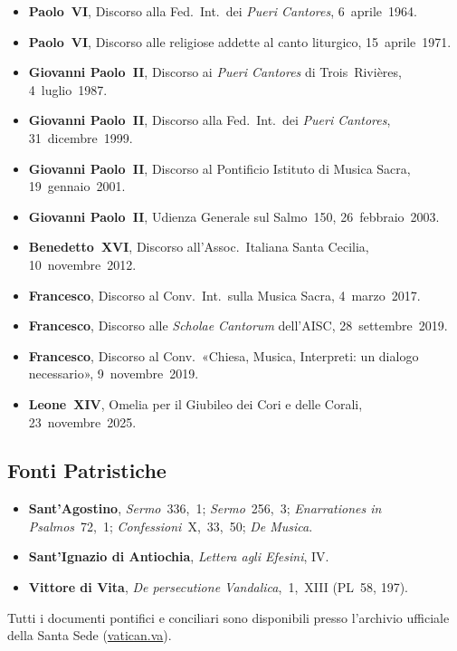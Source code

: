 \documentclass[12pt,a4paper]{article}
\begin{document}
	\begin{itemize}[leftmargin=*]
		\item \textbf{Paolo~VI}, Discorso alla Fed.\ Int.\ dei \emph{Pueri Cantores},
		6~aprile~1964.
		\item \textbf{Paolo~VI}, Discorso alle religiose addette al canto liturgico,
		15~aprile~1971.
		\item \textbf{Giovanni Paolo~II}, Discorso ai \emph{Pueri Cantores} di
		Trois~Rivières, 4~luglio~1987.
		\item \textbf{Giovanni Paolo~II}, Discorso alla Fed.\ Int.\ dei \emph{Pueri
			Cantores}, 31~dicembre~1999.
		\item \textbf{Giovanni Paolo~II}, Discorso al Pontificio Istituto di Musica
		Sacra, 19~gennaio~2001.
		\item \textbf{Giovanni Paolo~II}, Udienza Generale sul Salmo~150, 26~febbraio~2003.
		\item \textbf{Benedetto~XVI}, Discorso all'Assoc.\ Italiana Santa Cecilia,
		10~novembre~2012.
		\item \textbf{Francesco}, Discorso al Conv.\ Int.\ sulla Musica Sacra,
		4~marzo~2017.
		\item \textbf{Francesco}, Discorso alle \emph{Scholae Cantorum} dell'AISC,
		28~settembre~2019.
		\item \textbf{Francesco}, Discorso al Conv.\ «Chiesa, Musica, Interpreti: un
		dialogo necessario», 9~novembre~2019.
		\item \textbf{Leone~XIV}, Omelia per il Giubileo dei Cori e delle Corali,
		23~novembre~2025.
	\end{itemize}
	
	\subsection*{Fonti Patristiche}
	
	\begin{itemize}[leftmargin=*]
		\item \textbf{Sant'Agostino}, \emph{Sermo}~336,~1; \emph{Sermo}~256,~3;
		\emph{Enarrationes in Psalmos}~72,~1; \emph{Confessioni}~X,~33,~50;
		\emph{De Musica}.
		\item \textbf{Sant'Ignazio di Antiochia}, \emph{Lettera agli Efesini}, IV.
		\item \textbf{Vittore di Vita}, \emph{De persecutione Vandalica},~1,~XIII
		(PL~58, 197).
	\end{itemize}
	
	\medskip
	\noindent Tutti i documenti pontifici e conciliari sono disponibili presso
	l'archivio ufficiale della Santa Sede (\href{https://www.vatican.va}{vatican.va}).
	
\end{document}
